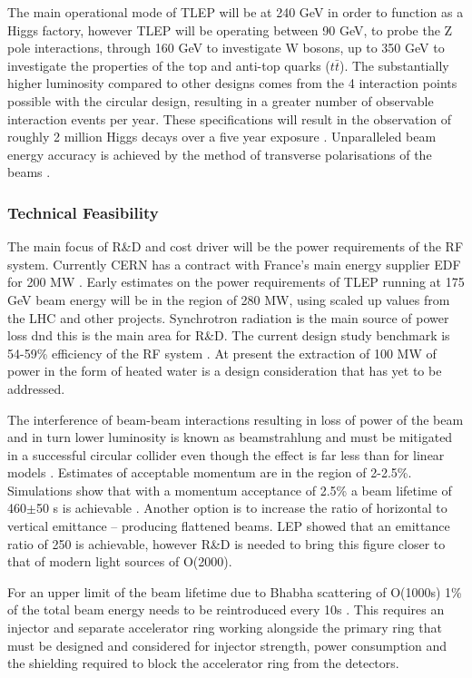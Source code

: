 The main operational mode of TLEP will be at 240 GeV in order to function as a Higgs factory, however TLEP will be operating between 90 GeV, to probe the Z pole interactions, through 160 GeV to investigate W bosons, up to 350 GeV to investigate the properties of the top and anti-top quarks ($t\bar{t}$). The substantially higher luminosity compared to other designs comes from the 4 interaction points possible with the circular design, resulting in a greater number of observable interaction events per year. These specifications will result in the observation of roughly 2 million Higgs decays over a five year exposure \cite{TLEP:CERNReport}. Unparalleled beam energy accuracy is achieved by the method of transverse polarisations of the beams \cite{TLEP:Review}.

\subsubsection{Technical Feasibility}

The main focus of R\&D and cost driver will be the power requirements of the RF system. Currently CERN has a contract with France's main energy supplier EDF for 200 MW \cite{TLEP:Luminosity}. Early estimates on the power requirements of TLEP running at 175 GeV beam energy will be in the region of 280 MW, using scaled \textendash up values from the LHC and other projects. Synchrotron radiation is the main source of power loss dnd this is the main area for R\&D. The current design study benchmark is 54-59\% efficiency of the RF system \cite{TLEP:Review}. At present the extraction of 100 MW of power in the form of heated water is a design consideration that has yet to be addressed.

The interference of beam-beam interactions resulting in loss of power of the beam and in turn lower luminosity is known as beamstrahlung and must be mitigated in a successful circular collider even though the effect is far less than for linear models \cite{TLEP:Luminosity}. Estimates of acceptable momentum are in the region of 2-2.5\%. Simulations show that with a momentum acceptance of 2.5\% a beam lifetime of 460$\pm$50 s is achievable \cite{TLEP:EnergyRestriction}. Another option is to increase the ratio of horizontal to vertical emittance – producing flattened beams. LEP showed that an emittance ratio of 250 is achievable, however R\&D is needed to bring this figure closer to that of modern light sources of O(2000).

For an upper limit of the beam lifetime due to Bhabha scattering of O(1000s) 1\% of the total beam energy needs to be reintroduced every 10s \cite{TLEP:Janot} \cite{TLEP:CERNOverview}. This requires an injector and separate accelerator ring working alongside the primary ring that must be designed and considered for injector strength, power consumption and the shielding required to block the accelerator ring from the detectors. 

